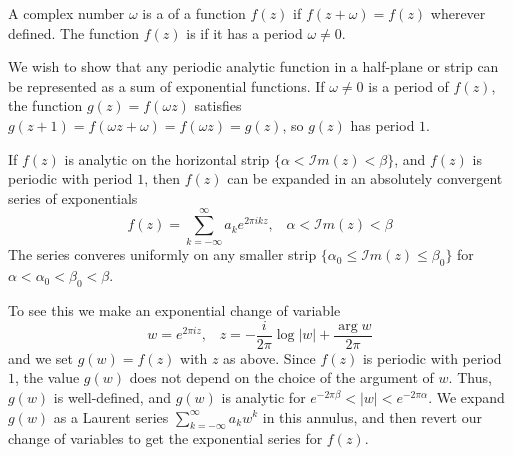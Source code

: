 \begin{definition}
    A complex number $\omega$ is a  of a function $f(z)$ if $f(z+\omega) = f(z)$ wherever defined. The function $f(z)$ is  if it has a period $\omega \neq 0$.
\end{definition}

We wish to show that any periodic analytic function in a half-plane or strip can be represented as a sum of exponential functions. If $\omega \neq 0$ is a period of $f(z)$, the function $g(z) = f(\omega z)$ satisfies $g(z+1) = f(\omega z+\omega) = f(\omega z) = g(z)$, so $g(z)$ has period $1$. 

\begin{theorem}
    If $f(z)$ is analytic on the horizontal strip $\{\alpha < \mathscr{I}m(z) < \beta\}$, and $f(z)$ is periodic with period $1$, then $f(z)$ can be expanded in an absolutely convergent series of exponentials \begin{equation*}
        f(z) = \sum_{k=-\infty}^{\infty}a_ke^{2\pi ikz},\;\;\;\alpha < \mathscr{I}m(z) < \beta
    \end{equation*}
    The series converes uniformly on any smaller strip $\{\alpha_0 \leq \mathscr{I}m(z) \leq \beta_0\}$ for $\alpha < \alpha_0 < \beta_0 < \beta$.
\end{theorem}
To see this we make an exponential change of variable \begin{equation*}
    w = e^{2\pi iz},\;\;\;z = -\frac{i}{2\pi}\log|w| + \frac{\arg w}{2\pi}
\end{equation*}
and we set $g(w) = f(z)$ with $z$ as above. Since $f(z)$ is periodic with period $1$, the value $g(w)$ does not depend on the choice of the argument of $w$. Thus, $g(w)$ is well-defined, and $g(w)$ is analytic for $e^{-2\pi \beta} < |w| < e^{-2\pi \alpha}$. We expand $g(w)$ as a Laurent series $\sum_{k=-\infty}^{\infty}a_kw^k$ in this annulus, and then revert our change of variables to get the exponential series for $f(z)$.

